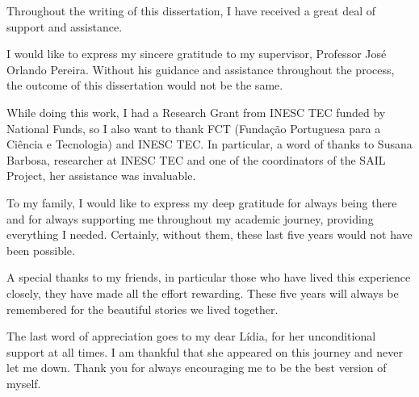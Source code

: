 Throughout the writing of this dissertation, I have received a great deal of support and assistance.

I would like to express my sincere gratitude to my supervisor, Professor José Orlando Pereira. Without his guidance and assistance throughout the process, the outcome of this dissertation would not be the same.

While doing this work, I had a Research Grant from INESC TEC funded by National Funds, so I also want to thank FCT (Fundação Portuguesa para a Ciência e Tecnologia) and INESC TEC. In particular, a word of thanks to Susana Barbosa, researcher at INESC TEC and one of the coordinators of the SAIL Project, her assistance was invaluable.

To my family, I would like to express my deep gratitude for always being there and for always supporting me throughout my academic journey, providing everything I needed. Certainly, without them, these last five years would not have been possible.

A special thanks to my friends, in particular those who have lived this experience closely, they have made all the effort rewarding. These five years will always be remembered for the beautiful stories we lived together.

The last word of appreciation goes to my dear Lídia, for her unconditional support at all times. I am thankful that she appeared on this journey and never let me down. Thank you for always encouraging me to be the best version of myself.
